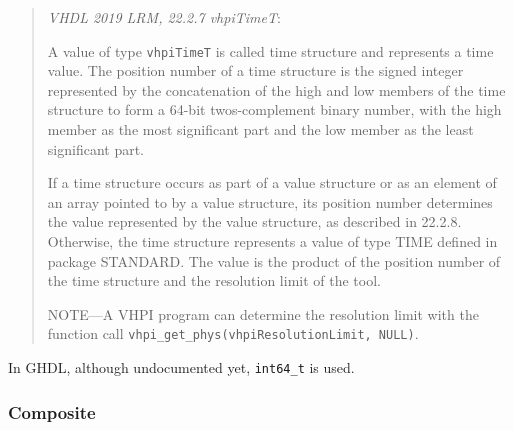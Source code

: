 \documentclass[
]{article}
\begin{document}
\begin{quote}
\emph{VHDL 2019 LRM, 22.2.7 vhpiTimeT}:

A value of type \texttt{vhpiTimeT} is called time structure and represents a time value.
The position number of a time structure is the signed integer represented by the concatenation of the high and low members of the time structure to form a 64-bit twos-complement binary number, with the high member as the most significant part and the low member as the least significant part.

If a time structure occurs as part of a value structure or as an element of an array pointed to by a value structure, its position number determines the value represented by the value structure, as described in 22.2.8. Otherwise, the time structure represents a value of type TIME defined in package STANDARD. The value is the product of the position number of the time structure and the resolution limit of the tool.

NOTE---A VHPI program can determine the resolution limit with the function call \texttt{vhpi\_get\_phys(vhpiResolutionLimit,\ NULL)}.
\end{quote}

In GHDL, although undocumented yet, \texttt{int64\_t} is used.

\hypertarget{composite}{%
\subsubsection{Composite}\label{composite}}
\end{document}
